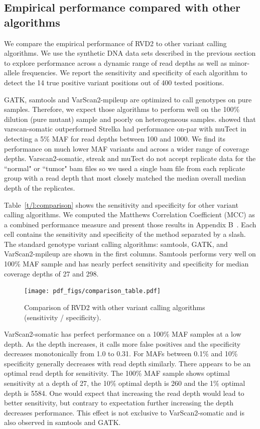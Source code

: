 \documentclass[11pt,reqno]{amsart}
\begin{document}
\subsection{Empirical performance compared with other algorithms}

We compare the empirical performance of RVD2 to other variant calling algorithms. We use the synthetic DNA data sets described in the previous section to explore performance across a dynamic range of read depths as well as minor-allele frequencies. We report the sensitivity and specificity of each algorithm to detect the 14 true positive variant positions out of 400 tested positions.

GATK, samtools and VarScan2-mpileup are optimized to call genotypes on pure samples. Therefore, we expect those algorithms to perform well on the 100\% dilution (pure mutant) sample and poorly on heterogeneous samples. \citet{Stead:2013fu} showed that varscan-somatic outperformed Strelka had performance on-par with muTect in detecting a 5\% MAF for read depths between 100 and 1000. We find its performance on much lower MAF variants and across a wider range of coverage depths. Varscan2-somatic, streak and muTect do not accept replicate data for the ``normal" or ``tumor" bam files so we used a single bam file from each replicate group with a read depth that most closely matched the median overall median depth of the replicates.

Table~\ref{t/l:comparison} shows the sensitivity and specificity for other variant calling algorithms. We computed the Matthews Correlation Coefficient (MCC) as a combined performance measure and present those results in Appendix B~\cite{}. Each cell contains the sensitivity and specificity of the method separated by a slash. The standard genotype variant calling algorithms: samtools, GATK, and VarScan2-mpileup are shown in the first columns. Samtools performs very well on 100\% MAF sample and has nearly perfect sensitivity and specificity for median coverage depths of 27 and 298. 

\begin{figure}[h]
\begin{center}
\texttt{[image: pdf\_figs/comparison\_table.pdf]}
\caption{Comparison of RVD2 with other variant calling algorithms (sensitivity / specificity).}
\label{fig:comparison}
\end{center}
\end{figure}

VarScan2-somatic has perfect performance on a 100\% MAF samples at a low depth. As the depth increases, it calls more false positives and the specificity decreases monotonically from 1.0 to 0.31. For MAFs between 0.1\% and 10\% specificity generally decreases with read depth similarly. There appears to be an optimal read depth for sensitivity. The 100\% MAF sample shows optimal sensitivity at a depth of 27, the 10\% optimal depth is 260 and the 1\% optimal depth is 5584. One would expect that increasing the read depth would lead to better sensitivity, but contrary to expectation further increasing the depth decreases performance. This effect is not exclusive to VarScan2-somatic and is also observed in samtools and GATK. 
\end{document}
